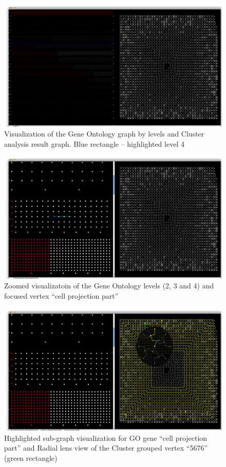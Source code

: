 \label{sec:appendix_D}

\begin{figure}[h!]
\centering
\includegraphics[scale=0.33, angle=90]{pictures/screenshot_1.png}
\caption{Visualization of the Gene Ontology graph by levels and Cluster analysis result graph. Blue rectangle -- highlighted level 4}
\end{figure}

\newpage
\begin{figure}[h!]
\centering
\includegraphics[scale=0.33, angle=90]{pictures/screenshot_2.png}
\caption{Zoomed visualizatoin of the Gene Ontology levels (2, 3 and 4) and focused vertex ``cell projection part''}
\end{figure}

\newpage
\begin{figure}[h!]
\centering
\includegraphics[scale=0.33, angle=90]{pictures/screenshot_3.png}
\caption{Highlighted sub-graph visualization for GO gene ``cell projection part'' and Radial lens view of the Cluster grouped vertex ``5676'' (green rectangle)}
\end{figure}

